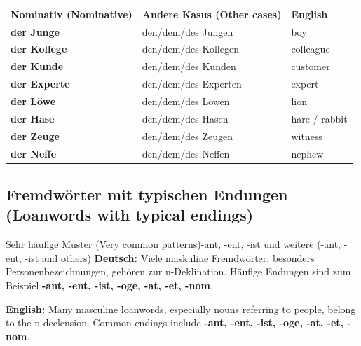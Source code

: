 \documentclass[a4paper,11pt]{article}
\newcommand{\GermanText}[1]{\textbf{Deutsch: }#1\par}
\newcommand{\EnglishText}[1]{{\small\color{SoftGray}\textbf{English: }#1\par}}
\begin{document}
            \begin{longtable}{>{\bfseries}p{4.0cm}|p{5.0cm}|p{5.0cm}}
                \rowcolor{HeaderBlueDark}
                \color{white}\textbf{Nominativ (Nominative)} & \color{white}\textbf{Andere Kasus (Other cases)} & \color{white}\textbf{English} \\
                der Junge & den/dem/des Jungen & boy \\
                der Kollege & den/dem/des Kollegen & colleague \\
                der Kunde & den/dem/des Kunden & customer \\
                der Experte & den/dem/des Experten & expert \\
                der Löwe & den/dem/des Löwen & lion \\
                der Hase & den/dem/des Hasen & hare / rabbit \\
                der Zeuge & den/dem/des Zeugen & witness \\
                der Neffe & den/dem/des Neffen & nephew \\
            \end{longtable}

        \subsection{Fremdwörter mit typischen Endungen \textnormal{(Loanwords with typical endings)}}

            \begin{grammarentry}{Sehr häufige Muster \textnormal{(Very common patterns)}}{-ant, -ent, -ist und weitere \textnormal{(-ant, -ent, -ist and others)}}
                \GermanText{Viele maskuline Fremdwörter, besonders Personenbezeichnungen, gehören zur n-Deklination. Häufige Endungen sind zum Beispiel \textbf{-ant, -ent, -ist, -oge, -at, -et, -nom}.}
                \EnglishText{Many masculine loanwords, especially nouns referring to people, belong to the n-declension. Common endings include \textbf{-ant, -ent, -ist, -oge, -at, -et, -nom}.}
            \end{grammarentry}
\end{document}
